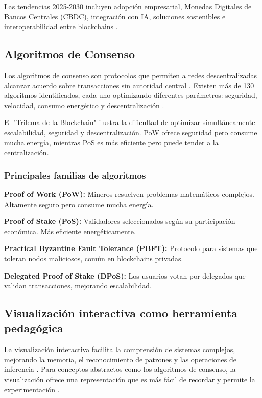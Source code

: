 \documentclass[spanish,12pt,letterpaper]{report}
\begin{document}
Las tendencias 2025-2030 incluyen adopción empresarial, Monedas Digitales de Bancos Centrales (CBDC), integración con IA, soluciones sostenibles e interoperabilidad entre blockchains \parencite{charterglobal2025top}.

\subsection{Algoritmos de Consenso}
Los algoritmos de consenso son protocolos que permiten a redes descentralizadas alcanzar acuerdo sobre transacciones sin autoridad central \parencite{visa2025what}. Existen más de 130 algoritmos identificados, cada uno optimizando diferentes parámetros: seguridad, velocidad, consumo energético y descentralización \parencite{researchgate2025systematic}.

El "Trilema de la Blockchain" ilustra la dificultad de optimizar simultáneamente escalabilidad, seguridad y descentralización. PoW ofrece seguridad pero consume mucha energía, mientras PoS es más eficiente pero puede tender a la centralización.

\subsubsection{Principales familias de algoritmos}
\textbf{Proof of Work (PoW):} Mineros resuelven problemas matemáticos complejos. Altamente seguro pero consume mucha energía.

\textbf{Proof of Stake (PoS):} Validadores seleccionados según su participación económica. Más eficiente energéticamente.

\textbf{Practical Byzantine Fault Tolerance (PBFT):} Protocolo para sistemas que toleran nodos maliciosos, común en blockchains privadas.

\textbf{Delegated Proof of Stake (DPoS):} Los usuarios votan por delegados que validan transacciones, mejorando escalabilidad.

\subsection{Visualización interactiva como herramienta pedagógica}
La visualización interactiva facilita la comprensión de sistemas complejos, mejorando la memoria, el reconocimiento de patrones y las operaciones de inferencia \parencite{researchgate2018towards}. Para conceptos abstractos como los algoritmos de consenso, la visualización ofrece una representación que es más fácil de recordar y permite la experimentación \parencite{stanford2025rodger}.
\end{document}
